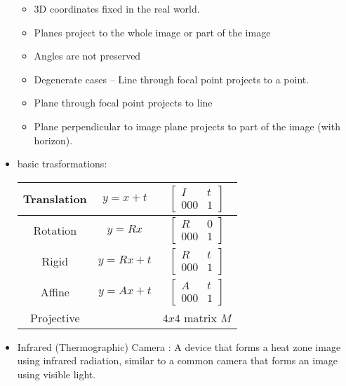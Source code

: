 \documentclass[10pt]{article}
\begin{document}
\begin{itemize}[label=\(\star\), leftmargin=1em, itemsep=-0.3em]
\begin{itemize}[label=\(\star\), leftmargin=1em, itemsep=-0.3em]
              \item 3D coordinates fixed in the real world.
              \item Planes project to the whole image or part of the image
              \item Angles are not preserved
              \item Degenerate cases – Line through focal point projects to a point.
              \item Plane through focal point projects to line
              \item Plane perpendicular to image plane projects to part of the image (with horizon).
          \end{itemize}
    \item basic trasformations:
          \begin{table}[h]
              \scriptsize
              \begin{tabular}{|c|c|c|}\hline
                  Translation & $y = x + t$  & $\begin{bmatrix} I & t \\ 000 & 1 \end{bmatrix}$ \\ \hline
                  Rotation    & $y = Rx$     & $\begin{bmatrix} R & 0 \\ 000 & 1 \end{bmatrix}$ \\ \hline
                  Rigid       & $y = Rx + t$ & $\begin{bmatrix} R & t \\ 000 & 1 \end{bmatrix}$ \\ \hline
                  Affine      & $y = Ax + t$ & $\begin{bmatrix} A & t \\ 000 & 1 \end{bmatrix}$ \\ \hline
                  Projective  &              & $4x4$ matrix $M$                                 \\ \hline
              \end{tabular}
          \end{table}
    \item Infrared (Thermographic) Camera : A device that forms a heat zone image using infrared radiation, similar to a common camera that forms an image using visible light.
          \begin{itemize}[label=\(\star\), leftmargin=1em, itemsep=-0.3em]

\end{itemize}
\end{itemize}
\end{document}
